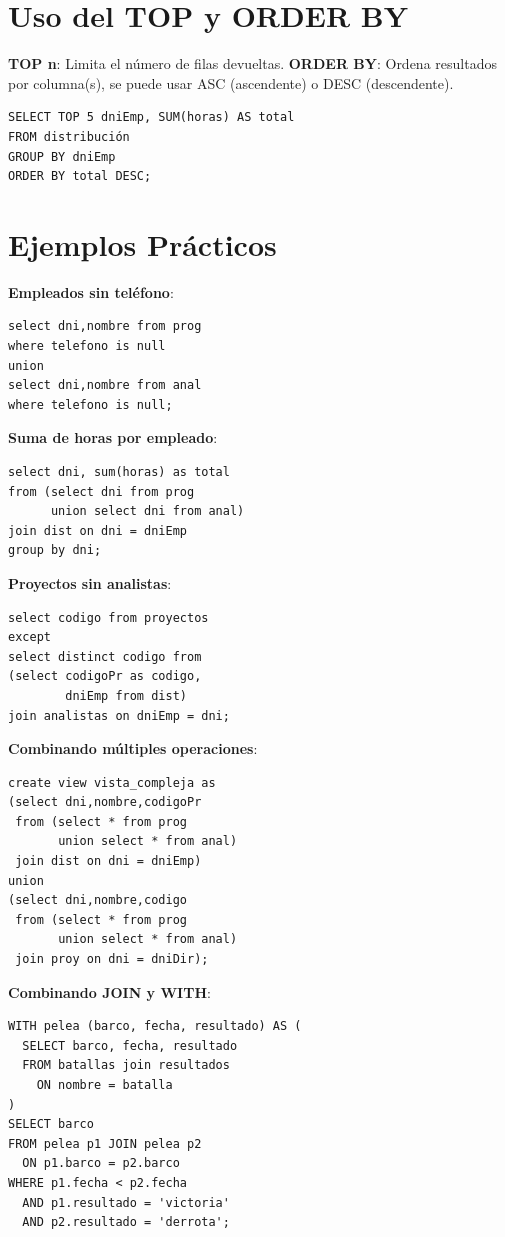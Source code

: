 \documentclass[8pt,a4paper,twocolumn]{article}
\begin{document}
\section{Uso del TOP y ORDER BY}
\textbf{TOP n}: Limita el número de filas devueltas.
\textbf{ORDER BY}: Ordena resultados por columna(s), se puede usar ASC (ascendente) o DESC (descendente).
\begin{lstlisting}
SELECT TOP 5 dniEmp, SUM(horas) AS total
FROM distribución
GROUP BY dniEmp
ORDER BY total DESC;
\end{lstlisting}

\section{Ejemplos Prácticos}

\textbf{Empleados sin teléfono}:
\begin{lstlisting}
select dni,nombre from prog
where telefono is null
union
select dni,nombre from anal
where telefono is null;
\end{lstlisting}

\textbf{Suma de horas por empleado}:
\begin{lstlisting}
select dni, sum(horas) as total
from (select dni from prog 
      union select dni from anal)
join dist on dni = dniEmp
group by dni;
\end{lstlisting}

\textbf{Proyectos sin analistas}:
\begin{lstlisting}
select codigo from proyectos
except
select distinct codigo from
(select codigoPr as codigo,
        dniEmp from dist)
join analistas on dniEmp = dni;
\end{lstlisting}

\textbf{Combinando múltiples operaciones}:
\begin{lstlisting}
create view vista_compleja as
(select dni,nombre,codigoPr 
 from (select * from prog 
       union select * from anal)
 join dist on dni = dniEmp)
union
(select dni,nombre,codigo 
 from (select * from prog 
       union select * from anal)
 join proy on dni = dniDir);
\end{lstlisting}

\textbf{Combinando JOIN y WITH}:
\begin{lstlisting}
WITH pelea (barco, fecha, resultado) AS (
  SELECT barco, fecha, resultado
  FROM batallas join resultados
    ON nombre = batalla
)
SELECT barco
FROM pelea p1 JOIN pelea p2
  ON p1.barco = p2.barco
WHERE p1.fecha < p2.fecha
  AND p1.resultado = 'victoria'
  AND p2.resultado = 'derrota';
\end{lstlisting}
\end{document}
